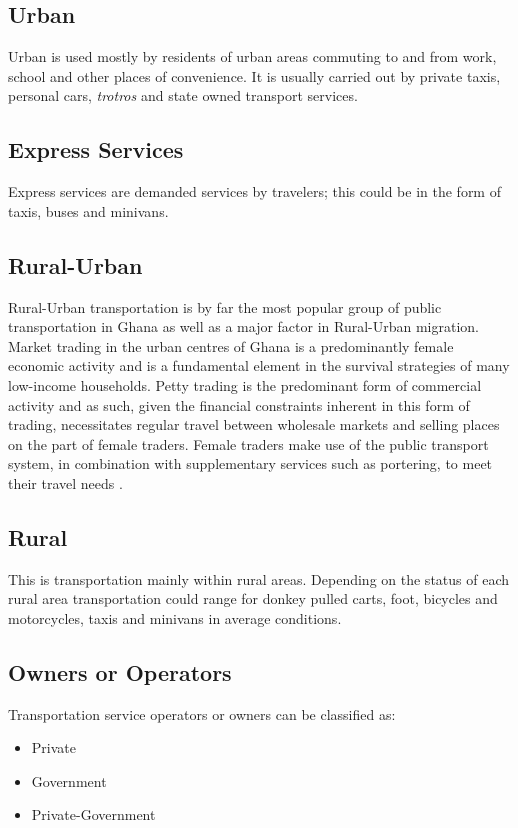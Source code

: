 \documentclass[oneside,12pt]{book}
\begin{document}
\subsection{Urban}
Urban is used mostly by residents of urban areas commuting to and from work, school and other places of convenience. It is usually carried out by private taxis, personal cars, \textit{trotros} and state owned transport services.

\subsection{Express Services}
Express services are demanded services by travelers; this could be in the form of taxis, buses and minivans.

\subsection{Rural-Urban}
Rural-Urban transportation is by far the most popular group of public transportation in Ghana as well as a major factor in Rural-Urban migration. Market trading in the urban centres of Ghana is a predominantly female economic activity and is a fundamental element in the survival strategies of many low-income households. Petty trading is the predominant form of commercial activity and as such, given the financial constraints inherent in this form of trading, necessitates regular travel between wholesale markets and selling places on the part of female traders. Female traders make use of the public transport system, in combination with supplementary services such as portering, to meet their travel needs \citep{grieco1995informal}. 

\subsection{Rural}
This is transportation mainly within rural areas. Depending on the status of each rural area transportation could range for donkey pulled carts, foot, bicycles and motorcycles, taxis and minivans in average conditions.

\subsection{Owners or Operators}
Transportation service operators or owners can be classified as:
\begin{itemize}
	\item Private
	\item Government
	\item Private-Government
\end{itemize}
\end{document}
